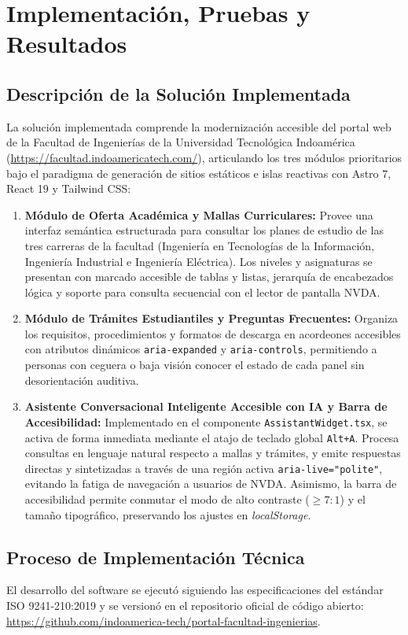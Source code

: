\chapter{Implementación, Pruebas y Resultados}
\label{chap:implementacion}

\section{Descripción de la Solución Implementada}
La solución implementada comprende la modernización accesible del portal web de la Facultad de Ingenierías de la Universidad Tecnológica Indoamérica (\url{https://facultad.indoamericatech.com/}), articulando los tres módulos prioritarios bajo el paradigma de generación de sitios estáticos e islas reactivas con Astro 7, React 19 y Tailwind CSS:

\begin{enumerate}
  \item \textbf{Módulo de Oferta Académica y Mallas Curriculares:} Provee una interfaz semántica estructurada para consultar los planes de estudio de las tres carreras de la facultad (Ingeniería en Tecnologías de la Información, Ingeniería Industrial e Ingeniería Eléctrica). Los niveles y asignaturas se presentan con marcado accesible de tablas y listas, jerarquía de encabezados lógica y soporte para consulta secuencial con el lector de pantalla NVDA.
  \item \textbf{Módulo de Trámites Estudiantiles y Preguntas Frecuentes:} Organiza los requisitos, procedimientos y formatos de descarga en acordeones accesibles con atributos dinámicos \texttt{aria-expanded} y \texttt{aria-controls}, permitiendo a personas con ceguera o baja visión conocer el estado de cada panel sin desorientación auditiva.
  \item \textbf{Asistente Conversacional Inteligente Accesible con IA y Barra de Accesibilidad:} Implementado en el componente \texttt{AssistantWidget.tsx}, se activa de forma inmediata mediante el atajo de teclado global \texttt{Alt+A}. Procesa consultas en lenguaje natural respecto a mallas y trámites, y emite respuestas directas y sintetizadas a través de una región activa \texttt{aria-live="polite"}, evitando la fatiga de navegación a usuarios de NVDA. Asimismo, la barra de accesibilidad permite conmutar el modo de alto contraste ($\ge 7:1$) y el tamaño tipográfico, preservando los ajustes en \textit{localStorage}.
\end{enumerate}

\section{Proceso de Implementación Técnica}
El desarrollo del software se ejecutó siguiendo las especificaciones del estándar ISO 9241-210:2019 y se versionó en el repositorio oficial de código abierto: \url{https://github.com/indoamerica-tech/portal-facultad-ingenierias}. 

